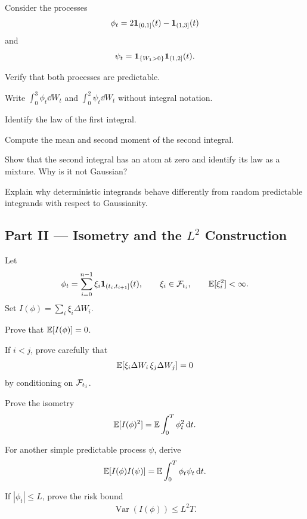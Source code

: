 \begin{exercise}
Consider the processes
\[
\phi_t=2\mathbf{1}_{(0,1]}(t)-\mathbf{1}_{(1,3]}(t)
\]
and
\[
\psi_t=\mathbf{1}_{\{W_1>0\}}\mathbf{1}_{(1,2]}(t).
\]
\begin{exparts}
  \item Verify that both processes are predictable.
  \item Write \(\int_0^3\phi_t\dd W_t\) and
  \(\int_0^2\psi_t\dd W_t\) without integral notation.
  \item Identify the law of the first integral.
  \item Compute the mean and second moment of the second integral.
  \item Show that the second integral has an atom at zero and identify its law
  as a mixture. Why is it not Gaussian?
  \item Explain why deterministic integrands behave differently from random
  predictable integrands with respect to Gaussianity.
\end{exparts}
\end{exercise}

\subsection*{Part II --- Isometry and the \(L^2\) Construction}

\begin{exercise}
Let
\[
\phi_t=\sum_{i=0}^{n-1}\xi_i\mathbf{1}_{(t_i,t_{i+1}]}(t),
\qquad
\xi_i\in\mathcal{F}_{t_i},
\qquad
\mathbb{E}[\xi_i^2]<\infty.
\]
Set \(I(\phi)=\sum_i\xi_i\Delta W_i\).
\begin{exparts}
  \item Prove that \(\mathbb{E}[I(\phi)]=0\).
  \item If \(i<j\), prove carefully that
  \[
  \mathbb{E}[\xi_i\Delta W_i\,\xi_j\Delta W_j]=0
  \]
  by conditioning on \(\mathcal{F}_{t_j}\).
  \item Prove the isometry
  \[
  \mathbb{E}[I(\phi)^2]=\mathbb{E}\int_0^T\phi_t^2\,\mathrm{d} t.
  \]
  \item For another simple predictable process \(\psi\), derive
  \[
  \mathbb{E}[I(\phi)I(\psi)]=\mathbb{E}\int_0^T\phi_t\psi_t\,\mathrm{d} t.
  \]
  \item If \(|\phi_t|\leq L\), prove the risk bound
  \[
  \operatorname{Var}(I(\phi))\leq L^2T.
  \]
\end{exparts}
\end{exercise}

